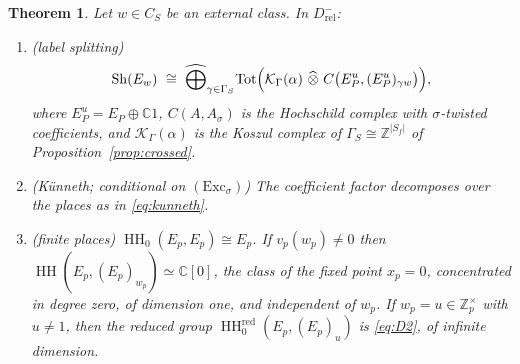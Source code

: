 \documentclass[11pt]{amsart}
\newtheorem{theorem}{Theorem}[section]
\theoremstyle{definition}
\theoremstyle{remark}
\newcommand{\C}{\mathbb C}
\newcommand{\Z}{\mathbb Z}
\newcommand{\HH}{\operatorname{HH}}
\newcommand{\Sh}{\operatorname{Sh}}
\begin{document}
\begin{theorem}\label{thm:shadow}
Let $w\in C_S$ be an external class.  In $D^{-}_{\mathrm{rel}}$:
\begin{enumerate}
\item[(a)] \emph{(label splitting)}
\begin{equation}\label{eq:labelsplit}
\Sh(E_w)\ \cong\ \widehat\bigoplus_{\gamma\in\Gamma_S}
\mathrm{Tot}\Bigl(\mathcal K_{\Gamma}(\alpha)\ \widehat\otimes\
C\bigl(E_P^{u},(E_P^{u})_{\gamma w}\bigr)\Bigr),
\end{equation}
where $E_P^{u}=E_P\oplus\C1$, $C(A,A_{\sigma})$ is the Hochschild
complex with $\sigma$-twisted coefficients, and $\mathcal K_{\Gamma}(\alpha)$
is the Koszul complex of $\Gamma_S\cong\Z^{|S_f|}$ of
Proposition~\ref{prop:crossed}.
\item[(b)] \emph{(K\"unneth; conditional on $(\mathrm{Exc}_{\sigma})$)}  The
coefficient factor decomposes over the places as in \eqref{eq:kunneth}.
\item[(c)] \emph{(finite places)}  $\HH_0(E_p,E_p)\cong E_p$.  If
$v_p(w_p)\ne0$ then $\HH(E_p,(E_p)_{w_p})\simeq\C[0]$, the class of the fixed
point $x_p=0$, concentrated in degree zero, of dimension one, and
\emph{independent of $w_p$}.  If $w_p=u\in\Z_p^{\times}$ with $u\ne1$, then
the reduced group $\HH_0^{\mathrm{red}}(E_p,(E_p)_u)$ is \eqref{eq:D2}, of
infinite dimension.
\end{enumerate}
\end{theorem}
\end{document}
